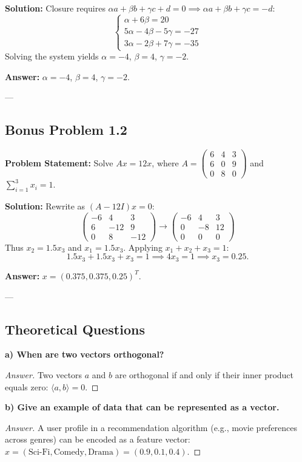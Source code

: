 \documentclass[11pt, a4paper]{article}
\begin{document}
\textbf{Solution:}
Closure requires $\alpha a + \beta b + \gamma c + d = 0 \implies \alpha a + \beta b + \gamma c = -d$:
$$ \begin{cases} \alpha + 6\beta = 20 \\ 5\alpha - 4\beta - 5\gamma = -27 \\ 3\alpha - 2\beta + 7\gamma = -35 \end{cases} $$
Solving the system yields $\alpha = -4$, $\beta = 4$, $\gamma = -2$.

\textbf{Answer:} $\alpha = -4$, $\beta = 4$, $\gamma = -2$.

---

\subsection*{Bonus Problem 1.2}
\textbf{Problem Statement:} Solve $Ax = 12x$, where $A = \begin{pmatrix} 6 & 4 & 3 \\ 6 & 0 & 9 \\ 0 & 8 & 0 \end{pmatrix}$ and $\sum_{i=1}^3 x_i = 1$.

\textbf{Solution:}
Rewrite as $(A - 12I)x = 0$:
$$ \begin{pmatrix} -6 & 4 & 3 \\ 6 & -12 & 9 \\ 0 & 8 & -12 \end{pmatrix} \to \begin{pmatrix} -6 & 4 & 3 \\ 0 & -8 & 12 \\ 0 & 0 & 0 \end{pmatrix} $$
Thus $x_2 = 1.5 x_3$ and $x_1 = 1.5 x_3$. Applying $x_1 + x_2 + x_3 = 1$:
$$ 1.5x_3 + 1.5x_3 + x_3 = 1 \implies 4x_3 = 1 \implies x_3 = 0.25. $$

\textbf{Answer:} $x = (0.375, 0.375, 0.25)^T$.

---

\subsection*{Theoretical Questions}

\textbf{a) When are two vectors orthogonal?}
\begin{proof}[Answer]
Two vectors $a$ and $b$ are orthogonal if and only if their inner product equals zero: $\langle a, b \rangle = 0$.
\end{proof}

\textbf{b) Give an example of data that can be represented as a vector.}
\begin{proof}[Answer]
A user profile in a recommendation algorithm (e.g., movie preferences across genres) can be encoded as a feature vector: $x = (\text{Sci-Fi}, \text{Comedy}, \text{Drama}) = (0.9, 0.1, 0.4)$.
\end{proof}
\end{document}
